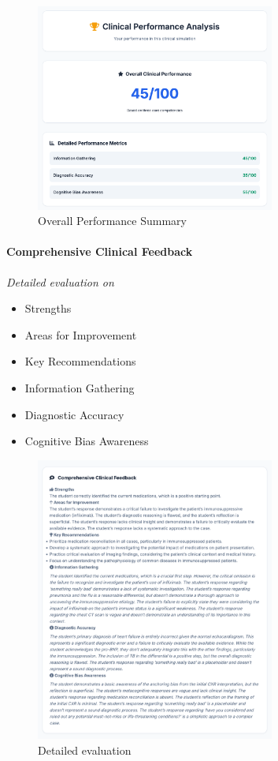 \begin{figure}[h]
  \centering
  \includegraphics[width=0.7\textwidth]{figures/ui/ui_overall.png}
  \caption{Overall Performance Summary}
  \label{fig:ui-overall}
\end{figure}

\paragraph{Comprehensive Clinical Feedback}
\textit{Detailed evaluation on}
\begin{itemize}
  \item Strengths
  \item Areas for Improvement
  \item Key Recommendations
  \item Information Gathering
  \item Diagnostic Accuracy
  \item Cognitive Bias Awareness
\end{itemize}

\begin{figure}[h]
  \centering
  \includegraphics[width=0.7\textwidth]{figures/ui/ui_detailed.png}
  \caption{Detailed evaluation}
  \label{fig:ui-detailed}
\end{figure}

